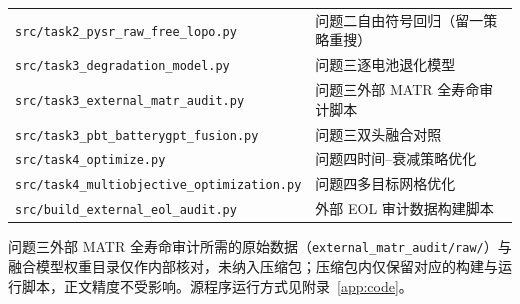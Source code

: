 \begin{table}[htbp]
\begin{tabular}{p{}p{}}
\texttt{src/task2\_pysr\_raw\_free\_lopo.py} & 问题二自由符号回归（留一策略重搜） \\
\texttt{src/task3\_degradation\_model.py} & 问题三逐电池退化模型 \\
\texttt{src/task3\_external\_matr\_audit.py} & 问题三外部 MATR 全寿命审计脚本 \\
\texttt{src/task3\_pbt\_batterygpt\_fusion.py} & 问题三双头融合对照 \\
\texttt{src/task4\_optimize.py} & 问题四时间--衰减策略优化 \\
\texttt{src/task4\_multiobjective\_optimization.py} & 问题四多目标网格优化 \\
\texttt{src/build\_external\_eol\_audit.py} & 外部 EOL 审计数据构建脚本 \\
\bottomrule
\end{tabular}
\end{table}

问题三外部 MATR 全寿命审计所需的原始数据（\texttt{external\_matr\_audit/raw/}）与融合模型权重目录仅作内部核对，未纳入压缩包；压缩包内仅保留对应的构建与运行脚本，正文精度不受影响。源程序运行方式见附录~\ref{app:code}。
